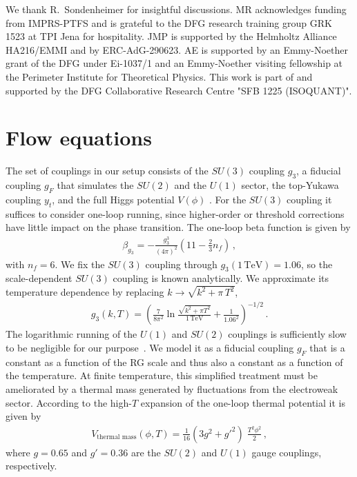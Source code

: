 \documentclass[aps,prd,11pt,tightenlines,superscriptaddress,nofootinbib,preprintnumbers,notitlepage]{revtex4-1}
\begin{document}
We thank R.~Sondenheimer for insightful discussions.  MR acknowledges funding
from IMPRS-PTFS and is grateful to the DFG research training group GRK 1523 at 
TPI Jena for hospitality.  JMP is supported by the Helmholtz Alliance HA216/EMMI
and by ERC-AdG-290623. AE is supported by an Emmy-Noether grant of the 
DFG under Ei-1037/1 and an Emmy-Noether visiting fellowship at the 
Perimeter Institute for Theoretical Physics. This work is part of and supported by the DFG
Collaborative Research Centre "SFB 1225 (ISOQUANT)".

\appendix
\section{Flow equations}
\label{app:der-flows}

The set of couplings in our setup consists of the $SU(3)$
coupling $g_3$, a fiducial coupling $g_F$ that simulates the $SU(2)$ and the
$U(1)$ sector, the top-Yukawa coupling $y_t$, and the full Higgs
potential $V(\phi)$ \cite{our_paper}. For the $SU(3)$ coupling it suffices to consider
one-loop running, since higher-order or threshold corrections have little
impact on the phase transition.  The one-loop beta function is
given by
%
\begin{align}
 \beta_{g_3} = -\frac{g_3^3}{(4 \pi)^2} \left(11 - \frac{2}{3} n_f\right) \,,
\end{align}
%
with $n_f=6$.  We fix the $SU(3)$ coupling through
$g_3(1\,\text{TeV})=1.06$, so the scale-dependent $SU(3)$ coupling
is known analytically. We approximate its temperature dependence by 
replacing $k \rightarrow \sqrt{k^2+\pi\, T^2}$,
%
\begin{align}
 g_3(k, T) = \left( \frac7{8 \pi ^2} \ln \frac{\sqrt{k^2+\pi T^2}}{1\,\text{TeV}} 
	  +\frac{1}{1.06^2}\right)^{-1/2} \,.
\end{align}
%
The logarithmic running of the $U(1)$ and $SU(2)$ couplings is
sufficiently slow to be negligible for our
purpose~\cite{our_paper}. We model it as a fiducial coupling $g_F$
that is a constant as a function of the RG scale and thus also a
constant as a function of the temperature.  At finite temperature,
this simplified treatment must be ameliorated by a thermal mass
generated by fluctuations from the electroweak sector.  According to
the high-$T$ expansion of the one-loop thermal potential it is given
by
%
\begin{align}
 V_{\text{thermal mass}} (\phi, T ) = \frac{1}{16}\left( 3g^2 + {g'}^{2} \right)
 \; \frac{T^2 \phi^2}{2} \,,
\end{align}
%
where $g=0.65$ and $g'=0.36$ are the $SU(2)$ and $U(1)$ gauge
couplings, respectively.\bigskip
\end{document}
